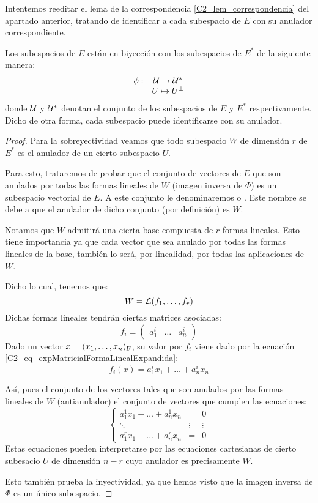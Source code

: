Intentemos reeditar el lema de la correspondencia \ref{C2_lem_correspondencia} del apartado anterior, tratando de identificar a cada subespacio de $E$ con su anulador correspondiente.
\begin{lem}
	\label{C2_lem_correspondenciaAnulador}
	Los subespacios de $E$ están en biyección con los subespacios de $E^*$ de la siguiente manera:
	\[\begin{array}{cc}
	\phi:& \mathcal{U}\rightarrow\mathcal{U}^*\\
	&U\mapsto U^{\perp}
	\end{array}\]
	donde $\mathcal{U}$ y $\mathcal{U}^*$ denotan el conjunto de los subespacios de $E$ y $E^*$ respectivamente.
	Dicho de otra forma, cada subespacio puede identificarse con su anulador.
\end{lem}
\begin{proof}
	Para la sobreyectividad veamos que todo subespacio $W$ de dimensión $r$ de $E^*$ es el anulador de un cierto subespacio $U$.
	
	Para esto, trataremos de probar que el conjunto de vectores de $E$ que son anulados por todas las formas lineales de $W$ (imagen inversa de $\Phi$) es un subespacio vectorial de $E$. A este conjunto le denominaremos  o . Este nombre se debe a que el anulador de dicho conjunto (por definición) es $W$.
	
	Notamos que $W$ admitirá una cierta base compuesta de $r$ formas lineales. Esto tiene importancia ya que cada vector que sea anulado por todas las formas lineales de la base, también lo será, por linealidad, por todas las aplicaciones de $W$.
	
	Dicho lo cual, tenemos que:
	\[W=\mathcal{L}(f_1,\dots,f_r)\]
	Dichas formas lineales tendrán ciertas matrices asociadas:
	\[f_i\equiv\begin{pmatrix}
	a_1^i & \dots & a_n^i
	\end{pmatrix}\]
	Dado un vector $x=(x_1,\dots,x_n)_{\mathcal{B}}$, su valor por $f_i$ viene dado por la ecuación  \eqref{C2_eq_expMatricialFormaLinealExpandida}:
	\[f_i(x)=a_1^ix_1+\dots+a_n^ix_n\]
	
	Así, pues el conjunto de los vectores tales que son anulados por las formas lineales de $W$ (antianulador)  el conjunto de vectores que cumplen las ecuaciones:
	\begin{equation}
	\label{C2_eq_ecuacionesAtianulador}
	\left\{\begin{array}{ccc}
	a_1^1x_1+\dots+a_n^1x_n&=&0\\
	\ddots& \vdots & \vdots\\
	a_1^rx_1+\dots+a_n^rx_n&=&0
	\end{array}\right.\end{equation}
	Estas ecuaciones pueden interpretarse por las ecuaciones cartesianas de cierto subesacio $U$ de dimensión $n-r$ cuyo anulador es precisamente $W$.
	
	Esto también prueba la inyectividad, ya que hemos visto que la imagen inversa de $\Phi$ es un único subespacio.
\end{proof}
